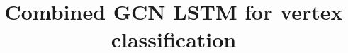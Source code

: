 \documentclass{article}
\title{Combined GCN LSTM for vertex classification}
\begin{document}

\maketitle








\pagebreak

% 
\end{document}
